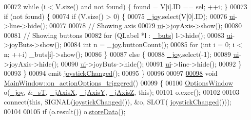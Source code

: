 \begin{DoxyCode}
00072     \textcolor{keywordflow}{while} (i < V.size() and not found) \{ found = V[i].ID == sel; ++i; \}
00073     \textcolor{keywordflow}{if} (not found) \{
00074         \textcolor{keywordflow}{if} (V.size() > 0) \{
00075             \hyperlink{a00004_a671f35800890e518713e1946671d8730}{\_joy}.select(V[0].ID);
00076             \hyperlink{a00004_a35466a70ed47252a0191168126a352a5}{ui}->line->hide();
00077             
00078             \textcolor{comment}{// Showing axis}
00079             \hyperlink{a00004_a35466a70ed47252a0191168126a352a5}{ui}->joyAxis->show();
00080             
00081             \textcolor{comment}{// Showing buttons}
00082             \textcolor{keywordflow}{for} (QLabel *l : \hyperlink{a00004_a8eaf474e1b8672f32873ed009e28ce8a}{\_buts}) l->hide();
00083             \hyperlink{a00004_a35466a70ed47252a0191168126a352a5}{ui}->joyButs->show();
00084             \textcolor{keywordtype}{int} n = \hyperlink{a00004_a671f35800890e518713e1946671d8730}{\_joy}.buttonCount();
00085             \textcolor{keywordflow}{for} (\textcolor{keywordtype}{int} i = 0; i < n; ++i) \_buts[i]->show();
00086         \}
00087         \textcolor{keywordflow}{else} \{
00088             \hyperlink{a00004_a671f35800890e518713e1946671d8730}{\_joy}.select(-1);
00089             \hyperlink{a00004_a35466a70ed47252a0191168126a352a5}{ui}->joyAxis->hide();
00090             \hyperlink{a00004_a35466a70ed47252a0191168126a352a5}{ui}->joyButs->hide();
00091             \hyperlink{a00004_a35466a70ed47252a0191168126a352a5}{ui}->line->hide();
00092         \}
00093     \}
00094     emit \hyperlink{a00004_ac85ba5aec3be2a51a348ff669b9dc842}{joystickChanged}();
00095 \}
00096 
00097 
\hypertarget{a00015_source_l00098}{}\hyperlink{a00004_a1dd57ccb62bc6f5a361aba6e088dd2e1}{00098} \textcolor{keywordtype}{void} \hyperlink{a00004_a1dd57ccb62bc6f5a361aba6e088dd2e1}{MainWindow::on\_actionOptions\_triggered}()
00099 \{
00100     \hyperlink{a00005}{OptionsWindow} o(\hyperlink{a00004_a671f35800890e518713e1946671d8730}{\_joy}, &\hyperlink{a00004_a97f8ecc7ecb930b796178cef7b975013}{\_sT}, \hyperlink{a00004_a282d4090e96c676578c4336391b1af08}{\_jAxisX}, \hyperlink{a00004_aaaced09ce813bbcac92047f5ef39f182}{\_jAxisY}, 
      \hyperlink{a00004_a18cc17eff4ff04ee0aae07c609e82d33}{\_jAxisZ}, \textcolor{keyword}{this});
00101     o.exec();
00102     
00103     connect(\textcolor{keyword}{this}, SIGNAL(\hyperlink{a00004_ac85ba5aec3be2a51a348ff669b9dc842}{joystickChanged}()), &o, SLOT(
      \hyperlink{a00004_ac85ba5aec3be2a51a348ff669b9dc842}{joystickChanged}()));
00104     
00105     \textcolor{keywordflow}{if} (o.result()) o.\hyperlink{a00005_ab0a56ad7347c20046602a7a2a1c83397}{storeData}();

\end{DoxyCode}
